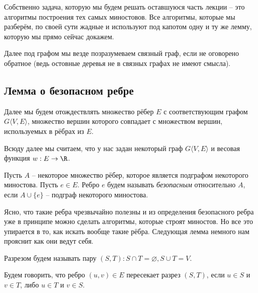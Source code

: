 Собственно задача, которую мы будем решать оставшуюся часть лекции -- это алгоритмы построения тех самых миностовов. 
Все алгоритмы, которые мы разберём, по своей сути жадные и используют под капотом одну и ту же лемму, которую мы прямо сейчас докажем.

Далее под графом мы везде позразумеваем связный граф, если не оговорено обратное (ведь остовные деревья не в связных графах не имеют смысла).

\subsection{Лемма о безопасном ребре}

\Note Далее мы будем отождествлять множество рёбер $E$ с соответствующим графом $G \langle V, E \rangle$, множество вершин которого совпадает с множеством вершин, используемых в рёбрах из $E$.

Всюду далее мы считаем, что у нас задан некоторый граф $G \langle V, E \rangle$ и весовая функция $w: E \to \R$.

\Def Пусть $A$ -- некоторое множество рёбер, которое является подграфом некоторого миностова. Пусть $e \in E$. Ребро $e$ будем называть \textit{безопасным} относительно $A$, если $A \cup \{e\}$ -- подграф некоторого миностова.

Ясно, что такие ребра чрезвычайно полезны и из определения безопасного ребра уже в принципе можно сделать алгоритмы, которые строят миностов. 
Но все это упирается в то, как искать вообще такие рёбра. Следующая лемма немного нам прояснит как они ведут себя.

\Def Разрезом будем называть пару $(S, T): S \cap T = \varnothing, S \cup T = V$.

\Def Будем говорить, что ребро $(u, v) \in E$ пересекает разрез $(S, T)$, если $u \in S$ и $v \in T$, либо $u \in T$ и $v \in S$.

